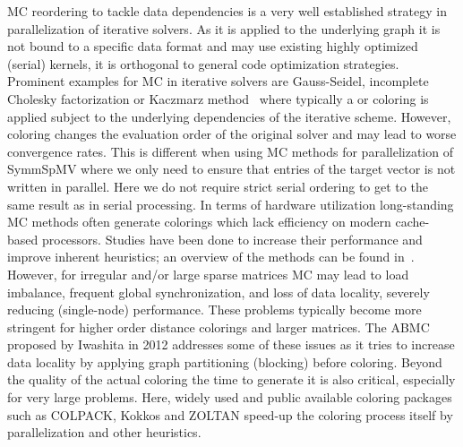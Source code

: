 
\Acrfull{MC} reordering to tackle data dependencies is a very well established strategy in parallelization of iterative solvers. As it is applied to the underlying graph it is not bound to a specific data format and may use existing highly optimized (serial) kernels, \ie it is orthogonal to general code optimization strategies.  
Prominent examples for  \acrshort{MC} in iterative solvers are Gauss-Seidel, incomplete 
Cholesky factorization or Kaczmarz method~\cite{RBGS,MC,feast_mc} where typically a \DONE or \DTWO coloring is applied subject to the underlying dependencies of the iterative scheme. However, coloring changes the evaluation order of the original solver and may lead to worse convergence rates. This is different when using  \acrshort{MC} methods for parallelization of \acrshort{SymmSpMV} where we only need to ensure that entries of the target vector is not written in parallel. Here we do not  require strict serial ordering to get to the same result as in serial processing.
In terms of hardware utilization long-standing \acrshort{MC} methods often generate colorings which lack efficiency on modern cache-based
processors. Studies have been done to increase their
performance and improve inherent heuristics; an overview of the methods can be found in~\cite{gebremedhin2000scalable,dist_k_def,COLPACK,equitable_color}. However, 
for irregular and/or large sparse 
matrices \acrshort{MC} may lead to load imbalance, frequent global synchronization, 
and loss of data locality, severely reducing (single-node) performance. 
These problems typically become more stringent for higher order distance
colorings and larger matrices.
The \acrfull{ABMC}~\cite{ABMC} proposed by Iwashita \etal in 2012 addresses some of these issues as it tries to increase data locality by applying graph partitioning (blocking) before coloring. 
Beyond the quality of the actual coloring the time to generate it is also critical, especially for very large problems. Here, widely used and public available coloring packages such as COLPACK\cite{COLPACK}, Kokkos\cite{kokkos} and ZOLTAN\cite{BOZDAG2008515,doi:10.1137/080732158} speed-up the coloring process itself by parallelization and other heuristics. 


